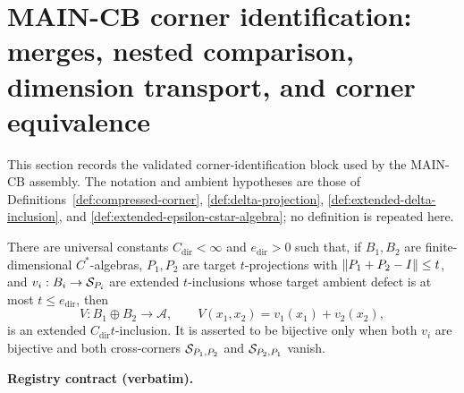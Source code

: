 \section{MAIN-CB corner identification: merges, nested comparison, dimension transport, and corner equivalence}\label{sec:maincb-corner-identification}

This section records the validated corner-identification block used by the MAIN-CB assembly.
The notation and ambient hypotheses are those of Definitions~\ref{def:compressed-corner},
\ref{def:delta-projection}, \ref{def:extended-delta-inclusion}, and
\ref{def:extended-epsilon-cstar-algebra}; no definition is repeated here.

\begin{lemma}\label{lem:maincb-direct-sum-inclusion-merge}
There are universal constants $C_{\mathrm{dir}}<\infty$ and $e_{\mathrm{dir}}>0$ such
that, if $B_1,B_2$ are finite-dimensional $C^*$-algebras, $P_1,P_2$ are target
$t$-projections with $\lVert P_1+P_2-I\rVert\le t$, and
$v_i:B_i\to\mathcal S_{P_i}$ are extended $t$-inclusions whose target ambient defect is at
most $t\le e_{\mathrm{dir}}$, then
\[
  V:B_1\oplus B_2\longrightarrow \mathcal A,
  \qquad V(x_1,x_2)=v_1(x_1)+v_2(x_2),
\]
is an extended $C_{\mathrm{dir}}t$-inclusion. It is asserted to be bijective only when
both $v_i$ are bijective and both cross-corners $\mathcal S_{P_1,P_2}$ and
$\mathcal S_{P_2,P_1}$ vanish.
\end{lemma}
\noindent\textbf{Registry contract (verbatim).}
